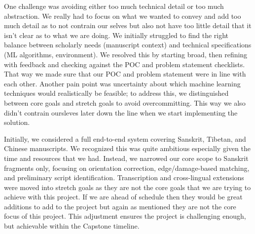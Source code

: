 \documentclass{article}
\begin{document}
\hspace{2em} One challenge was avoiding either too much technical detail or too much abstraction. We really had to focus on what we wanted to convey and add too much detail as to not contrain our selves but also not have too little detail that it isn't clear as to what we are doing. We initially struggled to find the right balance between scholarly needs (manuscript context) and technical specifications (ML algorithms, environment). We resolved this by starting broad, then refining with feedback and checking against the POC and problem statement checklists. That way we made sure that our POC and problem statement were in line with each other. Another pain point was uncertainty about which machine learning techniques would realistically be feasible; to address this, we distinguished between core goals and stretch goals to avoid overcommitting. This way we also didn't contrain oursleves later down the line when we start implementing the solution.

\hspace{2em} Initially, we considered a full end-to-end system covering Sanskrit, Tibetan, and Chinese manuscripts. We recognized this was quite ambitious especially given the time and resources that we had. Instead, we narrowed our core scope to Sanskrit fragments only, focusing on orientation correction, edge/damage-based matching, and preliminary script identification. Transcription and cross-lingual extensions were moved into stretch goals as they are not the core goals that we are trying to achieve with this project. If we are ahead of schedule then they would be great additions to add to the project but again as mentioned they are not the core focus of this project. This adjustment ensures the project is challenging enough, but achievable within the Capstone timeline.
\end{document}
